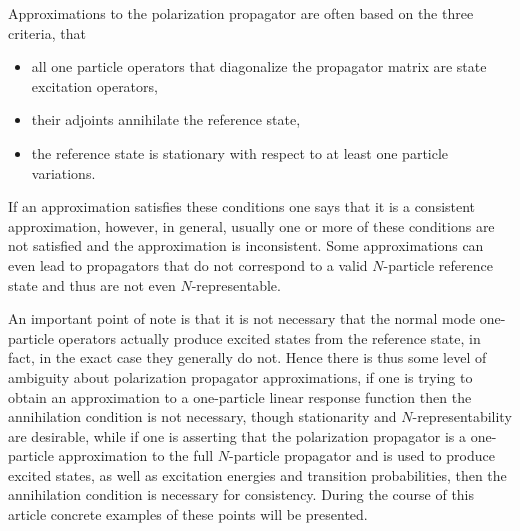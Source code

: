 \documentclass[aps,preprint]{revtex4}%
\begin{document}
Approximations to the polarization propagator are often based on the three
criteria, that

\begin{itemize}
\item all one particle operators that diagonalize the propagator matrix are
state excitation operators,

\item their adjoints annihilate the reference state,

\item the reference state is stationary with respect to at least one particle variations.
\end{itemize}

If an approximation satisfies these conditions one says that it is a
consistent approximation, however, in general, usually one or more of these
conditions are not satisfied and the approximation is inconsistent. Some
approximations can even lead to propagators that do not correspond to a valid
$N$-particle reference state and thus are not even $N$-representable.

An important point of note is that it is not necessary that the normal mode
one-particle operators actually produce excited states from the reference
state, in fact, in the exact case they generally do not. Hence there is thus
some level of ambiguity about polarization propagator approximations, if one
is trying to obtain an approximation to a one-particle linear response
function then the annihilation condition is not necessary, though stationarity
and $N$-representability are desirable, while if one is asserting that the
polarization propagator is a one-particle approximation to the full
$N$-particle propagator and is used to produce excited states, as well as
excitation energies and transition probabilities, then the annihilation
condition is necessary for consistency. During the course of this article
concrete examples of these points will be presented.
\end{document}
